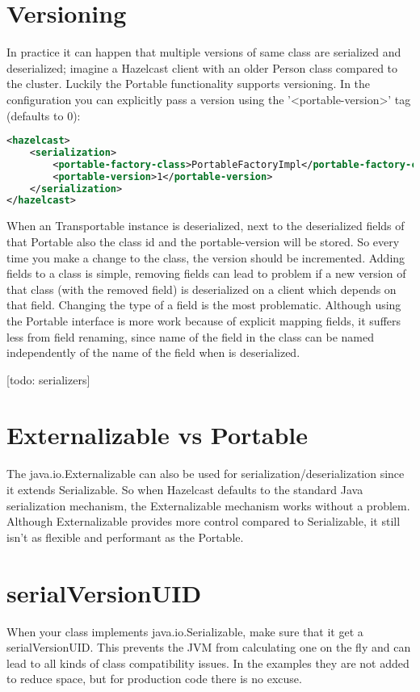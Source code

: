 \section{Versioning}
In practice it can happen that multiple versions of same class are serialized and deserialized; imagine a Hazelcast client with an older Person class compared to the cluster. Luckily the Portable functionality supports versioning. In the configuration you can explicitly pass a version using the '<portable-version>' tag (defaults to 0):
\begin{lstlisting}[language=xml]
<hazelcast>
    <serialization>
        <portable-factory-class>PortableFactoryImpl</portable-factory-class>
        <portable-version>1</portable-version>
    </serialization>
</hazelcast>
\end{lstlisting}
When an Transportable instance is deserialized, next to the deserialized fields of that Portable also the class id and the portable-version will be stored. So every time you make a change to the class, the version should be incremented. Adding fields to a class is simple, removing fields can lead to problem if a new version of that class (with the removed field) is deserialized on a client which depends on that field. Changing the type of a field is the most problematic. Although using the Portable interface is more work because of explicit mapping fields, it suffers less from field renaming, since name of the field in the class can be named independently of the name of the field when is deserialized.

[todo: serializers]

\section{Externalizable vs Portable}
The java.io.Externalizable can also be used for serialization/deserialization since it extends Serializable. So when Hazelcast defaults to the standard Java serialization mechanism, the Externalizable mechanism works without a problem. Although Externalizable provides more control compared to Serializable, it still isn't as flexible and performant as the Portable.

\section{serialVersionUID} 
When your class implements java.io.Serializable, make sure that it get a serialVersionUID. This prevents the JVM from calculating one on the fly and can lead to all kinds of class compatibility issues. In the examples they are not added to reduce space, but for production code there is no excuse.

